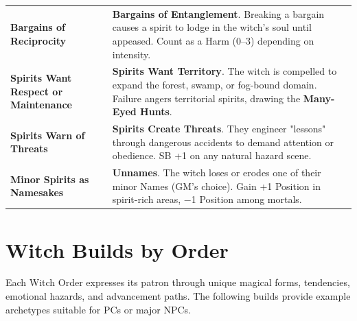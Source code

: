 \documentclass[11pt]{book}
\begin{document}
\begin{tcolorbox}[colback=black!3,colframe=black,title={Dark Choir: Thematic Swaps}]
\begin{tabularx}{\textwidth}{>{\raggedright\arraybackslash}p{} X}
    \textbf{Bargains of Reciprocity}  
    & \textbf{Bargains of Entanglement}.  
    Breaking a bargain causes a spirit to lodge in the witch's soul until appeased.  
    Count as a Harm (0--3) depending on intensity. \\[0.8em]
    
    \textbf{Spirits Want Respect or Maintenance}  
    & \textbf{Spirits Want Territory}.  
    The witch is compelled to expand the forest, swamp, or fog-bound domain.  
    Failure angers territorial spirits, drawing the \textbf{Many-Eyed Hunts}. \\[0.8em]
    
    \textbf{Spirits Warn of Threats}  
    & \textbf{Spirits Create Threats}.  
    They engineer "lessons" through dangerous accidents to demand attention or obedience.  
    SB +1 on any natural hazard scene. \\[0.8em]
    
    \textbf{Minor Spirits as Namesakes}  
    & \textbf{Unnames}.  
    The witch loses or erodes one of their minor Names (GM's choice).  
    Gain +1 Position in spirit-rich areas, −1 Position among mortals. \\[0.8em]
    
    \bottomrule
    \end{tabularx}
    \end{tcolorbox}

\section*{Witch Builds by Order}

Each Witch Order expresses its patron through unique magical forms, 
tendencies, emotional hazards, and advancement paths. The following 
builds provide example archetypes suitable for PCs or major NPCs.

\end{document}
